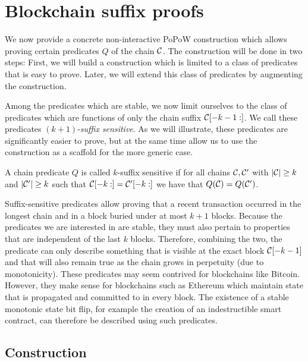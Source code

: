 \section{Blockchain suffix proofs}

We now provide a concrete non-interactive PoPoW construction which allows
proving certain predicates $Q$ of the chain $\mathcal{C}$. The construction will
be done in two steps: First, we will build a construction which is limited to
a class of predicates that is easy to prove. Later, we will extend this class
of predicates by augmenting the construction.

Among the predicates which are stable, we now limit ourselves to the class of
predicates which are functions of only the chain suffix $\mathcal{C}[-k - 1:]$. We
call these predicates $(k+1)$-\textit{suffix sensitive}. As we will illustrate,
these predicates are significantly easier to prove, but at the same time allow
us to use the construction as a scaffold for the more generic case.

\begin{definition}
A chain predicate $Q$ is called $k$-\textnormal{suffix sensitive} if for all
chains $\mathcal{C}, \mathcal{C}'$ with $|\mathcal{C}| \geq k$ and $|\mathcal{C}'| \geq k$ such that
$\mathcal{C}[-k:] = \mathcal{C}'[-k:]$ we have that $Q(\mathcal{C}) = Q(\mathcal{C}')$.
\end{definition}

Suffix-sensitive predicates allow proving that a recent transaction occurred in
the longest chain and in a block buried under at most $k + 1$ blocks. Because
the predicates we are interested in are stable, they must also pertain to
properties that are independent of the last $k$ blocks. Therefore, combining the
two, the predicate can only describe something that is visible at the exact
block $\mathcal{C}[-k-1]$ and that will also remain true as the chain grows in
perpetuity (due to monotonicity). These predicates may seem contrived for
blockchains like Bitcoin. However, they make sense for blockchains such as
Ethereum which maintain state \cite{vitalik} that is propagated and committed to
in every block. The existence of a stable monotonic state bit flip, for example
the creation of an indestructible smart contract, can therefore be described
using such predicates.

\subsection{Construction}

